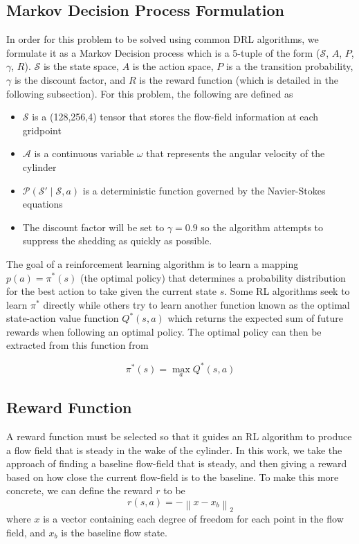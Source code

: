 \documentclass{article}
\begin{document}
\subsection{Markov Decision Process Formulation}
In order for this problem to be solved using common DRL algorithms, we formulate it as a Markov Decision process which is a 5-tuple of the form ($\mathcal{S}$, $A$, $P$, $\gamma$, $R$). $\mathcal{S}$ is the state space, $A$ is the action space, $P$ is a the transition probability, $\gamma$ is the discount factor, and $R$ is the reward function (which is detailed in the following subsection). For this problem, the following are defined as
\begin{itemize}
\item $\mathcal{S}$ is a (128,256,4) tensor that stores the flow-field information at each gridpoint
\item $\mathcal{A}$ is a continuous variable $\omega$ that represents the angular velocity of the cylinder
\item $\mathcal{P}(\mathcal{S}' \mid \mathcal{S}, a)$ is a deterministic function governed by the Navier-Stokes equations
\item The discount factor will be set to $\gamma = 0.9$ so the algorithm attempts to suppress the shedding as quickly as possible.
\end{itemize}

The goal of a reinforcement learning algorithm is to learn a mapping $p(a) = \pi^*(s)$ (the optimal policy) that determines a probability distribution for the best action to take given the current state $s$. Some RL algorithms seek to learn $\pi^*$ directly while others try to learn another function known as the optimal state-action value function $Q^*(s,a)$ which returns the expected sum of future rewards when following an optimal policy. The optimal policy can then be extracted from this function from 

\[ \pi^*(s) = \max_{a} Q^*(s,a) \]

\subsection{Reward Function}



A reward function must be selected so that it guides an RL algorithm to produce a flow field that is steady in the wake of the cylinder. In this work, we take the approach of finding a baseline flow-field that is steady, and then giving a reward based on how close the current flow-field is to the baseline. To make this more concrete, we can define the reward $r$ to be 
\begin{equation}
    r(s,a) = -\left\lVert x - x_b \right\rVert_2
\end{equation}
where $x$ is a vector containing each degree of freedom for each point in the flow field, and $x_b$ is the baseline flow state.
\end{document}
